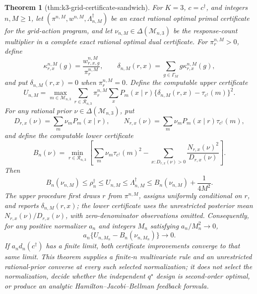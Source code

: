 \documentclass{article}
\newtheorem{theorem}{Theorem}
\begin{document}
\begin{theorem}[thm:k3-grid-certificate-sandwich]\label{thm:k3-grid-certificate-sandwich}
For \(K=3\), \(c=c^\dagger\), and integers \(n,M\geq1\), let \((\pi^{n,M},w^{n,M},\Lambda_{n,M}^\dagger)\) be an exact rational optimal primal certificate for the grid-action program, and let \(\nu_{n,M}\in\Delta(\mathcal M_{n,3})\) be the response-count multiplier in a complete exact rational optimal dual certificate.  For \(\pi_r^{n,M}>0\), define
\[
 \kappa_{r,x}^{n,M}(g)=\frac{w_{r,x,g}^{n,M}}{\pi_r^{n,M}},
 \qquad
 \delta_{n,M}(r,x)=\sum_{g\in\Gamma_M}g\kappa_{r,x}^{n,M}(g),
\]
and put \(\delta_{n,M}(r,x)=0\) when \(\pi_r^{n,M}=0\).  Define the computable upper certificate
\[
 U_{n,M}=\max_{m\in\mathcal M_{n,3}}
 \sum_{r\in\mathcal R_{n,3}}\pi_r^{n,M}\sum_xP_m(x\mid r)
 \{\delta_{n,M}(r,x)-\tau_{c^\dagger}(m)\}^2.
\]
For any rational prior \(\nu\in\Delta(\mathcal M_{n,3})\), put
\[
 D_{r,x}(\nu)=\sum_m\nu_mP_m(x\mid r),
 \qquad
 N_{r,x}(\nu)=\sum_m\nu_mP_m(x\mid r)\tau_{c^\dagger}(m),
\]
and define the computable lower certificate
\[
 B_n(\nu)=\min_{r\in\mathcal R_{n,3}}
 \left[
 \sum_m\nu_m\tau_{c^\dagger}(m)^2-
 \sum_{x:D_{r,x}(\nu)>0}\frac{N_{r,x}(\nu)^2}{D_{r,x}(\nu)}
 \right].
\]
Then
\[
 B_n(\nu_{n,M})\leq\rho_n^\dagger\leq U_{n,M}
 \leq\Lambda_{n,M}^\dagger
 \leq B_n(\nu_{n,M})+\frac{1}{4M^2}.
\]
The upper procedure first draws \(r\) from \(\pi^{n,M}\), assigns uniformly conditional on \(r\), and reports \(\delta_{n,M}(r,x)\); the lower certificate uses the unrestricted posterior mean \(N_{r,x}(\nu)/D_{r,x}(\nu)\), with zero-denominator observations omitted.  Consequently, for any positive normalizer \(a_n\) and integers \(M_n\) satisfying \(a_n/M_n^2\to0\),
\[
 a_n\{U_{n,M_n}-B_n(\nu_{n,M_n})\}\longrightarrow0.
\]
If \(a_nd_n(c^\dagger)\) has a finite limit, both certificate improvements converge to that same limit.  This theorem supplies a finite-\(n\) multivariate rule and an unrestricted rational-prior converse at every such selected normalization; it does not select the normalization, decide whether the independent \(q^\star\) design is second-order optimal, or produce an analytic Hamilton--Jacobi--Bellman feedback formula.
\end{theorem}
\end{document}

